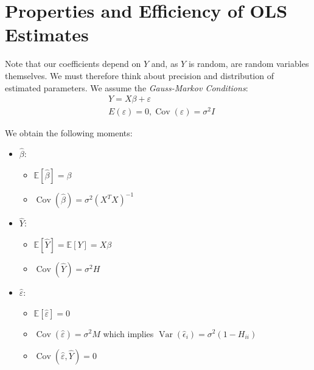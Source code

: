 \documentclass[11pt, %
	oneside, %
	english, %
	onehalfspacing, %
	]{article} %
\numberwithin{equation}{section}
\begin{document}
\clearpage

\section{Properties and Efficiency of OLS Estimates}

Note that our coefficients depend on $Y$ and, as $Y$ is random, are random variables themselves. We must therefore think about precision and distribution of estimated parameters. We assume the \emph{Gauss-Markov Conditions}:
\begin{equation*}
    \begin{aligned}
        & Y=X \beta+\varepsilon \\
        & E(\varepsilon)=0, \operatorname{Cov}(\varepsilon)=\sigma^2 I
    \end{aligned}
\end{equation*}

We obtain the following moments:

\begin{itemize}
    \item $\hat{\beta}$:
    \begin{itemize}
        \item $\mathbb{E} \left[ \hat{\beta}\right] = \beta$
        \item $\operatorname{Cov} \left( \hat{\beta}\right) = \sigma^2 (X^T X)^{-1}$
    \end{itemize}
    \item $\hat{Y}$:
    \begin{itemize}
        \item $\mathbb{E} \left[ \hat{Y}\right] = \mathbb{E} \left[ Y\right] = X\beta$
        \item $\operatorname{Cov} \left( \hat{Y}\right) = \sigma^2H$
    \end{itemize}
    \item $\hat{\varepsilon}$:
    \begin{itemize}
        \item $\mathbb{E} \left[ \hat{\varepsilon}\right]=0$
        \item $\operatorname{Cov} \left( \hat{\varepsilon}\right) = \sigma^2 M$ which implies $\operatorname{Var}(\hat{\epsilon}_i) = \sigma^2 (1 - H_{ii})$
        \item $\operatorname{Cov} \left( \hat{\varepsilon}, \hat{Y}\right) = 0$
    \end{itemize}
\end{itemize}
\end{document}
